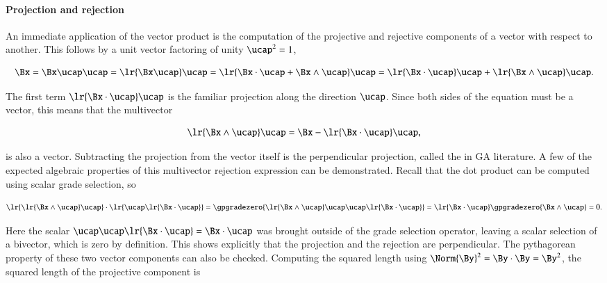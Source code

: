 \paragraph{Projection and rejection}

An immediate application of the vector product is the computation of the projective and rejective components of a vector with respect to another.
This follows by a unit vector factoring of unity \( \ucap^2 = 1 \),

\begin{dmath}\label{eqn:SimpleProducts2:680}
\Bx =
\Bx \ucap \ucap
=
\lr{ \Bx \ucap } \ucap
=
\lr{ \Bx \cdot \ucap + \Bx \wedge \ucap } \ucap
=
\lr{ \Bx \cdot \ucap } \ucap + \lr{ \Bx \wedge \ucap } \ucap.
\end{dmath}

The first term \( \lr{ \Bx \cdot \ucap } \ucap \) is the familiar projection along the direction \( \ucap \).
Since both sides of the equation must be a vector, this means that the multivector

\begin{dmath}\label{eqn:SimpleProducts2:700}
\lr{ \Bx \wedge \ucap } \ucap
=\Bx - \lr{ \Bx \cdot \ucap } \ucap,
\end{dmath}

is also a vector.
Subtracting the projection from the vector itself is the perpendicular projection, called the  in GA literature.
A few of the expected algebraic properties of this multivector rejection expression can be demonstrated.
Recall that the dot product can be computed using scalar grade selection, so

\begin{dmath}\label{eqn:SimpleProducts2:720}
\lr{ \lr{ \Bx \wedge \ucap } \ucap } \cdot \lr{ \ucap \lr{ \Bx \cdot \ucap } }
=
\gpgradezero{ \lr{ \Bx \wedge \ucap } \ucap \ucap \lr{ \Bx \cdot \ucap } }
=
\lr{ \Bx \cdot \ucap }
\gpgradezero{ \Bx \wedge \ucap }
= 0.
\end{dmath}

Here the scalar \( \ucap \ucap \lr{ \Bx \cdot \ucap } = \Bx \cdot \ucap \) was brought outside of the grade selection operator, leaving a scalar selection of a bivector, which is zero by definition.
This shows explicitly that the projection and the rejection are perpendicular.
The pythagorean property of these two vector components can also be checked.
Computing the squared length using \( \Norm{\By}^2 = \By \cdot \By = \By^2 \), the squared length of the projective component is

